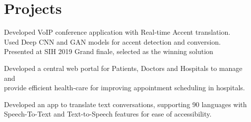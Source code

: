 \documentclass[]{deedy-resume-openfont}
\begin{document}
\begin{minipage}[t]{0.66\textwidth}

\section{Projects}
\vspace{1pt}

\vspace{2pt}
\hspace{10pt}
Developed VoIP conference application with Real-time Accent translation. \\
\hspace{10pt}
Used Deep CNN and GAN models for accent detection and conversion. \\
\hspace{10pt}
Presented at SIH 2019 Grand finale, selected as the winning solution
\sectionsep

\vspace{2pt}
\hspace{10pt}
Developed a central web portal for Patients, Doctors and Hospitals to manage and \\
\hspace{10pt}
provide efficient health-care for improving appointment scheduling in hospitals. \\
\sectionsep

\vspace{2pt}
\hspace{10pt}
Developed an app to translate text conversations, supporting 90 languages with \\
\hspace{10pt}
Speech-To-Text and Text-to-Speech features for ease of accessibility.
\sectionsep



\end{minipage}
\end{document}
